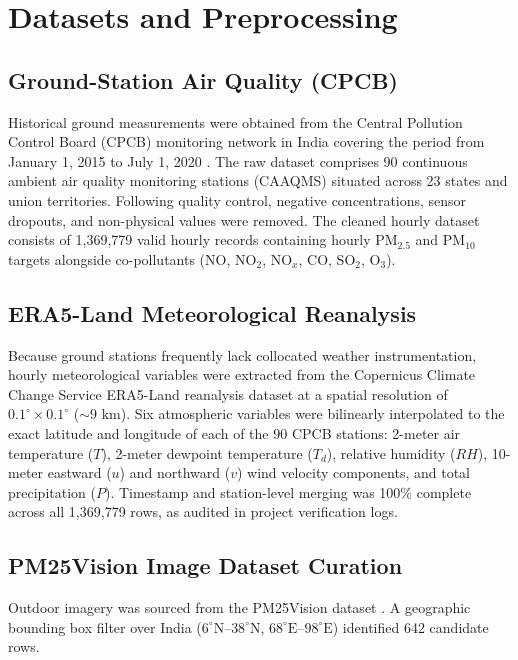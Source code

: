 \documentclass[conference]{IEEEtran}
\begin{document}
\section{Datasets and Preprocessing}

\subsection{Ground-Station Air Quality (CPCB)}
Historical ground measurements were obtained from the Central Pollution Control Board (CPCB) monitoring network in India covering the period from January 1, 2015 to July 1, 2020 \cite{rao2020cpcbdata}. The raw dataset comprises 90 continuous ambient air quality monitoring stations (CAAQMS) situated across 23 states and union territories. Following quality control, negative concentrations, sensor dropouts, and non-physical values were removed. The cleaned hourly dataset consists of 1,369,779 valid hourly records containing hourly $\text{PM}_{2.5}$ and $\text{PM}_{10}$ targets alongside co-pollutants ($\text{NO}$, $\text{NO}_2$, $\text{NO}_x$, $\text{CO}$, $\text{SO}_2$, $\text{O}_3$).

\subsection{ERA5-Land Meteorological Reanalysis}
Because ground stations frequently lack collocated weather instrumentation, hourly meteorological variables were extracted from the Copernicus Climate Change Service ERA5-Land reanalysis dataset \cite{munoz2021era5land} at a spatial resolution of $0.1^\circ \times 0.1^\circ$ ($\sim 9\text{ km}$). Six atmospheric variables were bilinearly interpolated to the exact latitude and longitude of each of the 90 CPCB stations: 2-meter air temperature ($T$), 2-meter dewpoint temperature ($T_d$), relative humidity ($RH$), 10-meter eastward ($u$) and northward ($v$) wind velocity components, and total precipitation ($P$). Timestamp and station-level merging was 100\% complete across all 1,369,779 rows, as audited in project verification logs.

\subsection{PM25Vision Image Dataset Curation}
Outdoor imagery was sourced from the PM25Vision dataset \cite{pm25vision2023}. A geographic bounding box filter over India ($6^\circ\text{N}$--$38^\circ\text{N}$, $68^\circ\text{E}$--$98^\circ\text{E}$) identified 642 candidate rows. 
\end{document}
